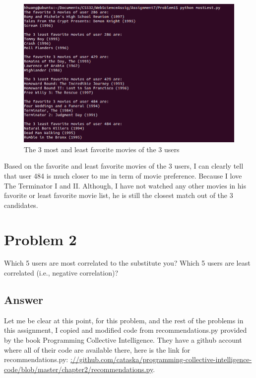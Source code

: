 \documentclass[12pt]{article}
\begin{document}
\begin{figure}[h]
\centering
\includegraphics[width=6.5in]{mostleast.png}
\caption{The 3 most and least favorite movies of the 3 users}
\end{figure}

Based on the favorite and least favorite movies of the 3 users, I can clearly tell that user 484 is much closer to me in term of movie preference. Because I love The Terminator I and II. Although, I have not watched any other movies in his favorite or least favorite movie list, he is still the closest match out of the 3 candidates.



\section*{Problem 2}

Which 5 users are most correlated to the substitute you? Which
5 users are least correlated (i.e., negative correlation)?

\subsection*{Answer}

Let me be clear at this point, for this problem, and the rest of the problems in this assignment, I copied and modified code from recommendations.py provided by the book Programming Collective Intelligence. They have a github account where all of their code are available there, here is the link for recommendations.py: \url{://github.com/cataska/programming-collective-intelligence-code/blob/master/chapter2/recommendations.py}. 
\end{document}
